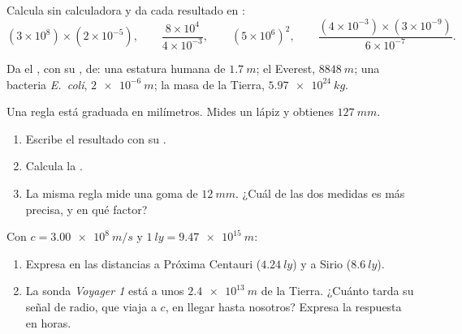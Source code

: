 \begin{exercise}[$\star$]\label{exo:g10:orders-of-magnitude:3}
Calcula sin calculadora y da cada resultado en :
\[
(3\times10^{8})\times(2\times10^{-5}), \qquad
\frac{8\times10^{4}}{4\times10^{-3}}, \qquad
(5\times10^{6})^{2}, \qquad
\frac{(4\times10^{-3})\times(3\times10^{-9})}{6\times10^{-7}} .
\]
\end{exercise}

\begin{exercise}[$\star$]\label{exo:g10:orders-of-magnitude:4}
Da el , con su , de: una estatura humana de
$\qty{1.7}{m}$; el Everest, $\qty{8848}{m}$; una bacteria
\emph{E.~coli}, $\qty{2e-6}{m}$; la masa de la Tierra,
$\qty{5.97e24}{kg}$.
\end{exercise}

\begin{exercise}[$\star$]\label{exo:g10:orders-of-magnitude:5}
Una regla está graduada en milímetros. Mides un lápiz y obtienes
$\qty{127}{mm}$.
\begin{enumerate}
  \item Escribe el resultado con su .
  \item Calcula la .
  \item La misma regla mide una goma de $\qty{12}{mm}$. ¿Cuál de las dos
        medidas es más precisa, y en qué factor?
\end{enumerate}
\end{exercise}

\begin{exercise}[$\star\star$]\label{exo:g10:orders-of-magnitude:6}
Con $c = \qty{3.00e8}{m/s}$ y $\qty{1}{ly} = \qty{9.47e15}{m}$:
\begin{enumerate}
  \item Expresa en  las distancias a Próxima Centauri
        ($\qty{4.24}{ly}$) y a Sirio ($\qty{8.6}{ly}$).
  \item La sonda \emph{Voyager 1} está a unos $\qty{2.4e13}{m}$ de la
        Tierra. ¿Cuánto tarda su señal de radio, que viaja a $c$, en
        llegar hasta nosotros? Expresa la respuesta en horas.
\end{enumerate}
\end{exercise}

